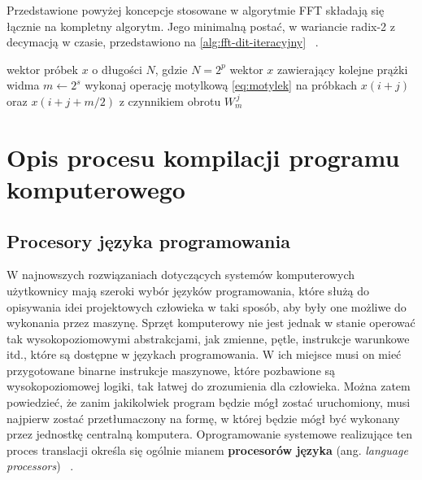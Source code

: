 Przedstawione powyżej koncepcje stosowane w algorytmie FFT składają się łącznie na kompletny algorytm. Jego minimalną postać, w wariancie radix-2 z decymacją w czasie, przedstawiono na \cref{alg:fft-dit-iteracyjny} ~\cite{CormenIntroductionAlgorithms}.
\begin{algorithm}[h]
\caption{Algorytm FFT o podstawie 2 z decymacją w czasie, na podstawie ~\cite{ZielinskiDSP, CormenIntroductionAlgorithms}}
\label{alg:fft-dit-iteracyjny}
\begin{algorithmic}[1]
\Require wektor próbek $x$ o długości $N$, gdzie $N = 2^p$
\Ensure wektor $x$ zawierający kolejne prążki widma 
\Statex
{}
    \State {}
     
        \State $m \gets 2^s$ 
         
             
                \State wykonaj operację motylkową \eqref{eq:motylek}
                \Statex \hspace{\algorithmicindent}\hspace{\algorithmicindent}\hspace{\algorithmicindent}
                        na próbkach $x(i+j)$ oraz $x(i+j+m/2)$
                \Statex \hspace{\algorithmicindent}\hspace{\algorithmicindent}\hspace{\algorithmicindent}
                        z czynnikiem obrotu $W_m^{\,j}$
            \EndFor
        \EndFor
    \EndFor
\EndFunction
\end{algorithmic}
\end{algorithm}

\newpage
\section{Opis procesu kompilacji programu komputerowego}
\subsection{Procesory języka programowania}
W najnowszych rozwiązaniach dotyczących systemów komputerowych użytkownicy mają szeroki wybór języków programowania, które służą do opisywania idei projektowych człowieka w taki sposób, aby były one możliwe do wykonania przez maszynę. Sprzęt komputerowy nie jest jednak w stanie operować tak wysokopoziomowymi abstrakcjami, jak zmienne, pętle, instrukcje warunkowe itd., które są dostępne w językach programowania. W ich miejsce musi on mieć przygotowane binarne instrukcje maszynowe, które pozbawione są wysokopoziomowej logiki, tak łatwej do zrozumienia dla człowieka. Można zatem powiedzieć, że zanim jakikolwiek program będzie mógł zostać uruchomiony, musi najpierw zostać przetłumaczony na formę, w której będzie mógł być wykonany przez jednostkę centralną komputera. 
Oprogramowanie systemowe realizujące ten proces translacji określa się ogólnie mianem \textbf{ procesorów języka} (ang. \textit{language processors}) ~\cite{Kompilatory_Aho}.


